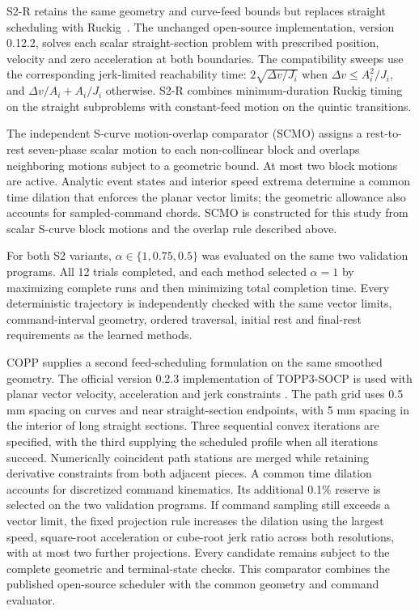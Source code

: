 \documentclass[preprint,12pt]{elsarticle}
\begin{document}
S2-R retains the same geometry and curve-feed bounds but replaces straight scheduling with Ruckig~\citep{Berscheid2021Ruckig}. The unchanged open-source implementation, version 0.12.2, solves each scalar straight-section problem with prescribed position, velocity and zero acceleration at both boundaries. The compatibility sweeps use the corresponding jerk-limited reachability time: $2\sqrt{\Delta v/J_i}$ when $\Delta v\leq A_i^2/J_i$, and $\Delta v/A_i+A_i/J_i$ otherwise. S2-R combines minimum-duration Ruckig timing on the straight subproblems with constant-feed motion on the quintic transitions.

The independent S-curve motion-overlap comparator (SCMO) assigns a rest-to-rest seven-phase scalar motion to each non-collinear block and overlaps neighboring motions subject to a geometric bound. At most two block motions are active. Analytic event states and interior speed extrema determine a common time dilation that enforces the planar vector limits; the geometric allowance also accounts for sampled-command chords. SCMO is constructed for this study from scalar S-curve block motions and the overlap rule described above.

For both S2 variants, $\alpha\in\{1,0.75,0.5\}$ was evaluated on the same two validation programs. All 12 trials completed, and each method selected $\alpha=1$ by maximizing complete runs and then minimizing total completion time. Every deterministic trajectory is independently checked with the same vector limits, command-interval geometry, ordered traversal, initial rest and final-rest requirements as the learned methods.

COPP supplies a second feed-scheduling formulation on the same smoothed geometry. The official version 0.2.3 implementation of TOPP3-SOCP is used with planar vector velocity, acceleration and jerk constraints \citep{Wang2026COPPSoftware}. The path grid uses 0.5 mm spacing on curves and near straight-section endpoints, with 5 mm spacing in the interior of long straight sections. Three sequential convex iterations are specified, with the third supplying the scheduled profile when all iterations succeed. Numerically coincident path stations are merged while retaining derivative constraints from both adjacent pieces. A common time dilation accounts for discretized command kinematics. Its additional 0.1\% reserve is selected on the two validation programs. If command sampling still exceeds a vector limit, the fixed projection rule increases the dilation using the largest speed, square-root acceleration or cube-root jerk ratio across both resolutions, with at most two further projections. Every candidate remains subject to the complete geometric and terminal-state checks. This comparator combines the published open-source scheduler with the common geometry and command evaluator.
\end{document}
